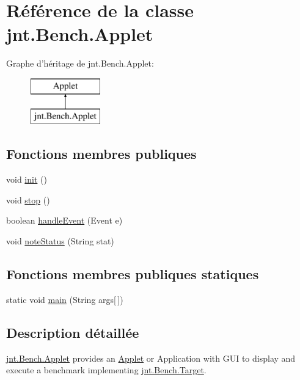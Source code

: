 \hypertarget{classjnt_1_1Bench_1_1Applet}{\section{Référence de la classe jnt.\-Bench.\-Applet}
\label{classjnt_1_1Bench_1_1Applet}
}
Graphe d'héritage de jnt.\-Bench.\-Applet\-:\begin{figure}[H]
\begin{center}
\leavevmode
\includegraphics[height=2.000000cm]{d7/ddf/classjnt_1_1Bench_1_1Applet}
\end{center}
\end{figure}
\subsection*{Fonctions membres publiques}
\begin{DoxyCompactItemize}
\item 
void \hyperlink{classjnt_1_1Bench_1_1Applet_a54b7c975bcba940c87ccfa197c8a2b61}{init} ()
\item 
void \hyperlink{classjnt_1_1Bench_1_1Applet_a8c0a97f2e1d9b795203ca12e6c96fed8}{stop} ()
\item 
boolean \hyperlink{classjnt_1_1Bench_1_1Applet_a4b90b4d75bc1f2c082ff92826f599b36}{handle\-Event} (Event e)
\item 
void \hyperlink{classjnt_1_1Bench_1_1Applet_ab48d64c3129115fd26a2ffb2c5e971a8}{note\-Status} (String stat)
\end{DoxyCompactItemize}
\subsection*{Fonctions membres publiques statiques}
\begin{DoxyCompactItemize}
\item 
static void \hyperlink{classjnt_1_1Bench_1_1Applet_a51abb923fe907cb3156420f556c09b29}{main} (String args\mbox{[}$\,$\mbox{]})
\end{DoxyCompactItemize}


\subsection{Description détaillée}
\hyperlink{classjnt_1_1Bench_1_1Applet}{jnt.\-Bench.\-Applet} provides an \hyperlink{classjnt_1_1Bench_1_1Applet}{Applet} or Application with G\-U\-I to display and execute a benchmark implementing \hyperlink{interfacejnt_1_1Bench_1_1Target}{jnt.\-Bench.\-Target}.

